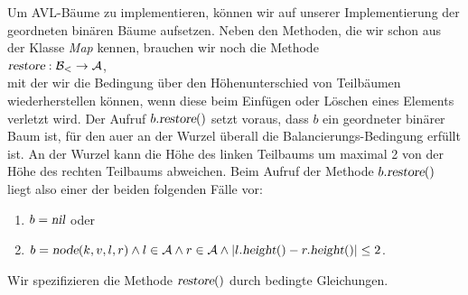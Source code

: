 Um  AVL-B\"aume zu  implementieren, k\"onnen wir auf unserer Implementierung der geordneten
bin\"aren B\"aume aufsetzen. 
Neben den Methoden, die wir schon aus der Klasse \textsl{Map} kennen, brauchen wir noch
die Methode \\[0.2cm]
\hspace*{1.3cm} $\textsl{restore}: \mathcal{B}_< \rightarrow \mathcal{A}$, \\[0.2cm]
mit der wir die Bedingung \"uber den H\"ohenunterschied von
Teilb\"aumen wiederherstellen k\"onnen, wenn diese beim Einf\"ugen oder L\"oschen eines Elements
verletzt wird.  
Der Aufruf $b.\textsl{restore}()$ setzt voraus, dass $b$ ein geordneter bin\"arer Baum ist,
f\"ur den au\3er an der Wurzel \"uberall die Balancierungs-Bedingung erf\"ullt ist.
An der Wurzel kann die H\"ohe des linken Teilbaums um maximal 2 von der H\"ohe des rechten
Teilbaums abweichen. Beim Aufruf der Methode $b.\textsl{restore}()$ liegt also einer der
beiden folgenden F\"alle vor: 
\begin{enumerate}
\item $b = \textsl{nil}$ \quad oder
\item $b = \textsl{node}(k,v,l,r) \wedge l \in \mathcal{A} \wedge r \in \mathcal{A} \wedge
       |l.\textsl{height}() - r.\textsl{height}()| \leq 2$.
\end{enumerate}
 Wir spezifizieren die Methode $\textsl{restore}()$ durch
bedingte Gleichungen.
